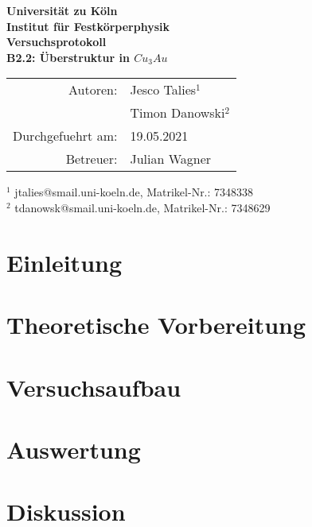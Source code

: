 \documentclass{article}
\begin{document}
\thispagestyle{empty}
\vspace*{\fill}
\begin{center}
	\Huge
	\textbf{Universität zu Köln}\\
	\LARGE
	\textbf{Institut für Festkörperphysik}\\
	\vspace{2cm}
	\textbf{Versuchsprotokoll}\\
	\vspace{0.5cm}
	\large
	\textbf{B2.2: Überstruktur in $Cu_3Au$}\\
	\normalsize
	\vspace{2cm}
	\begin{tabular}{r l}
		Autoren: 	& Jesco Talies$^1$\\
					& Timon Danowski$^2$\\
		Durchgefuehrt am:	& 19.05.2021\\
		Betreuer:	& Julian Wagner
	\end{tabular}
\end{center}
\vfill\footnotesize
$^1$ jtalies@smail.uni-koeln.de, Matrikel-Nr.: 7348338\\
$^2$ tdanowsk@smail.uni-koeln.de, Matrikel-Nr.: 7348629
\normalsize

\newpage
\thispagestyle{empty}
\tableofcontents
\clearpage
\setcounter{page}{1}
\section{Einleitung}

   
\section{Theoretische Vorbereitung}


\section{Versuchsaufbau}


\section{Auswertung}
        
\section{Diskussion} 
\end{document}
